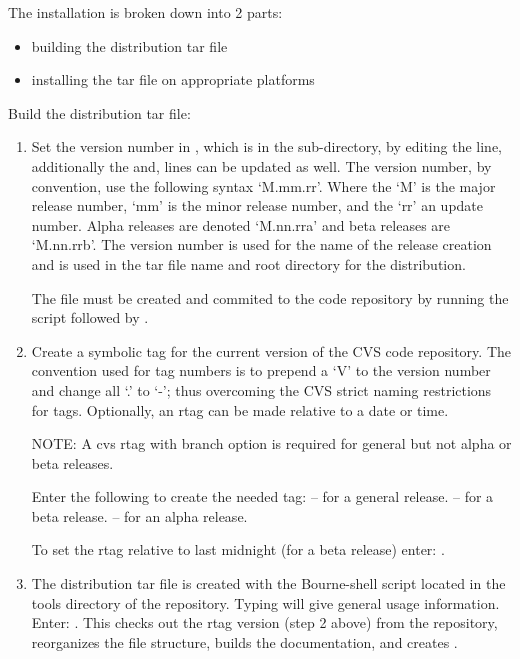 The installation is broken down into 2 parts: 
  \begin{itemize}
  \item building the distribution tar file
  \item installing the tar file on appropriate platforms
  \end{itemize}

Build the \hypre{} distribution tar file:

\begin{enumerate}

   \item Set the version number in , which is in the
    sub-directory, by editing the 
   line, additionally the  and,
    lines can be updated as well.
   The version number, by convention, use the following syntax `M.mm.rr'.
   Where the `M' is the major release number, `mm' is the minor
   release number, and the `rr' an update number. Alpha releases are denoted 
   `M.nn.rra' and beta releases are `M.nn.rrb'. The version number is used 
   for the name of the release creation and is used in the tar file name and
   root directory for the distribution. 

   The  file must be created and commited to the code repository by
   running the  script followed by .

   \item Create a symbolic tag for the current version of the CVS code 
   repository. The convention used for tag numbers is to prepend a `V' to the
   version number and change all `.' to `-'; thus overcoming the CVS strict 
   naming restrictions for tags.  Optionally, an rtag can be made relative to
   a date or time. 

   NOTE: A cvs rtag with branch option is required for general but not alpha or
   beta releases.

   Enter the following to create the needed tag:
    -- for a general release. 
    -- for a beta release. 
    -- for an alpha release. 

   To set the rtag relative to last midnight (for a beta release) enter:
   .

   \item The distribution tar file is created with the  Bourne-shell
   script located in the tools directory of the \hypre{} repository.  Typing 
    will give general usage information. 
   Enter: . This checks out the rtag version (step 2 above)
   from the repository, reorganizes the file structure, builds the documentation,
   and creates .

\end{enumerate}

